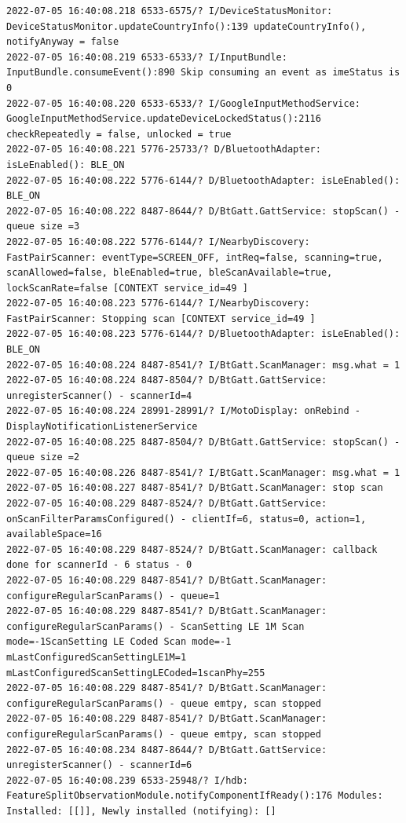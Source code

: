 \documentclass[a4paper,12pt]{book}
\begin{document}
\begin{lstlisting}
2022-07-05 16:40:08.218 6533-6575/? I/DeviceStatusMonitor: DeviceStatusMonitor.updateCountryInfo():139 updateCountryInfo(), notifyAnyway = false
2022-07-05 16:40:08.219 6533-6533/? I/InputBundle: InputBundle.consumeEvent():890 Skip consuming an event as imeStatus is 0
2022-07-05 16:40:08.220 6533-6533/? I/GoogleInputMethodService: GoogleInputMethodService.updateDeviceLockedStatus():2116 checkRepeatedly = false, unlocked = true
2022-07-05 16:40:08.221 5776-25733/? D/BluetoothAdapter: isLeEnabled(): BLE_ON
2022-07-05 16:40:08.222 5776-6144/? D/BluetoothAdapter: isLeEnabled(): BLE_ON
2022-07-05 16:40:08.222 8487-8644/? D/BtGatt.GattService: stopScan() - queue size =3
2022-07-05 16:40:08.222 5776-6144/? I/NearbyDiscovery: FastPairScanner: eventType=SCREEN_OFF, intReq=false, scanning=true, scanAllowed=false, bleEnabled=true, bleScanAvailable=true, lockScanRate=false [CONTEXT service_id=49 ]
2022-07-05 16:40:08.223 5776-6144/? I/NearbyDiscovery: FastPairScanner: Stopping scan [CONTEXT service_id=49 ]
2022-07-05 16:40:08.223 5776-6144/? D/BluetoothAdapter: isLeEnabled(): BLE_ON
2022-07-05 16:40:08.224 8487-8541/? I/BtGatt.ScanManager: msg.what = 1
2022-07-05 16:40:08.224 8487-8504/? D/BtGatt.GattService: unregisterScanner() - scannerId=4
2022-07-05 16:40:08.224 28991-28991/? I/MotoDisplay: onRebind - DisplayNotificationListenerService
2022-07-05 16:40:08.225 8487-8504/? D/BtGatt.GattService: stopScan() - queue size =2
2022-07-05 16:40:08.226 8487-8541/? I/BtGatt.ScanManager: msg.what = 1
2022-07-05 16:40:08.227 8487-8541/? D/BtGatt.ScanManager: stop scan
2022-07-05 16:40:08.229 8487-8524/? D/BtGatt.GattService: onScanFilterParamsConfigured() - clientIf=6, status=0, action=1, availableSpace=16
2022-07-05 16:40:08.229 8487-8524/? D/BtGatt.ScanManager: callback done for scannerId - 6 status - 0
2022-07-05 16:40:08.229 8487-8541/? D/BtGatt.ScanManager: configureRegularScanParams() - queue=1
2022-07-05 16:40:08.229 8487-8541/? D/BtGatt.ScanManager: configureRegularScanParams() - ScanSetting LE 1M Scan mode=-1ScanSetting LE Coded Scan mode=-1 mLastConfiguredScanSettingLE1M=1 mLastConfiguredScanSettingLECoded=1scanPhy=255
2022-07-05 16:40:08.229 8487-8541/? D/BtGatt.ScanManager: configureRegularScanParams() - queue emtpy, scan stopped
2022-07-05 16:40:08.229 8487-8541/? D/BtGatt.ScanManager: configureRegularScanParams() - queue emtpy, scan stopped
2022-07-05 16:40:08.234 8487-8644/? D/BtGatt.GattService: unregisterScanner() - scannerId=6
2022-07-05 16:40:08.239 6533-25948/? I/hdb: FeatureSplitObservationModule.notifyComponentIfReady():176 Modules: Installed: [[]], Newly installed (notifying): []

\end{lstlisting}
\end{document}
